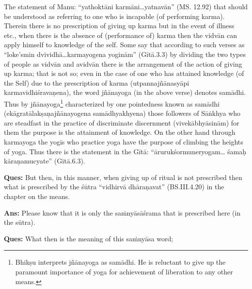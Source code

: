 The statement of Manu: “yathoktāni karmāni…yatnavān” (MS. 12.92) that should be understood as referring to one who is incapable (of performing karma). Therein there is no prescription of giving up karma but in the event of illness etc., when there is the absence of (performance of) karma then the vidvān can apply himself to knowledge of the self. Some say that according to such verses as “loke’smin dvividhā…karmayogena yoginām” (Gītā.3.3) by dividing the two types of people as vidvān and avidvān there is the arrangement of the action of giving up karma; that is not so; even in the case of one who has attained knowledge (of the Self)  due to the prescription of karma (utpannajñānasyāpi karmavidhiśravaṇena), the word jñānayoga (in the above verse) denotes samādhi. Thus by jñānayoga\footnote{Bhikṣu interprets jñānayoga as samādhi. He is reluctant to give up the paramount importance of yoga for achievement of liberation to any other means.} characterized by one pointedness known as samādhi (ekāgratālakṣaṇajñānayogena samādhyakhyena) those followers of Sāṅkhya who are steadfast in the practice of discriminate discernment (vivekābhyāsinām) for them the purpose is the attainment of knowledge. On the other hand through karmayoga the yogīs who practice yoga have the purpose of climbing the heights of yoga. Thus there is the  statement in the Gītā: “ārurukśormuneryogam… śamaḥ kāraṇamucyate” (Gītā.6.3).

\textbf{Ques:} But then, in this manner, when giving up of ritual is not prescribed then what is prescribed by the śūtra “vidhirvā dhāraṇavat” (BS.III.4.20) in the chapter on the means.

\textbf{Ans:} Please know that it is only the saṁnyāsāśrama that is prescribed here (in the sūtra). 

\textbf{Ques:} What then is the meaning of this saṁnyāsa word; 

